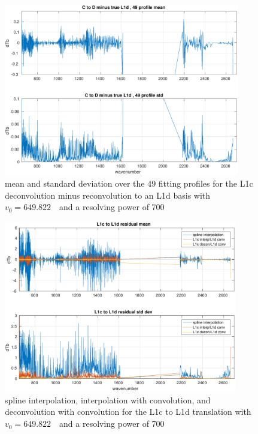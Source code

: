 \documentclass[11pt]{article}
\begin{document}
\begin{figure} %
  \centering
  \includegraphics[height=7.5cm]{figures/CtoD700s_diff.pdf}
  \caption{mean and standard deviation over the 49 fitting profiles
    for the L1c deconvolution minus reconvolution to an L1d basis
    with $v_0=649.822$~\wn\ and a resolving power of 700}
  \label{L1d700s}
\end{figure}

\begin{figure} %
  \centering
  \includegraphics[height=7.5cm]{figures/CtoD_interp_diff.pdf}
  \caption{spline interpolation, interpolation with convolution, 
    and deconvolution with convolution for the {\airs} L1c to L1d
    translation with $v_0=649.822$~\wn\ and a resolving power of 700}
  \label{interpL1d}
\end{figure}
\end{document}
